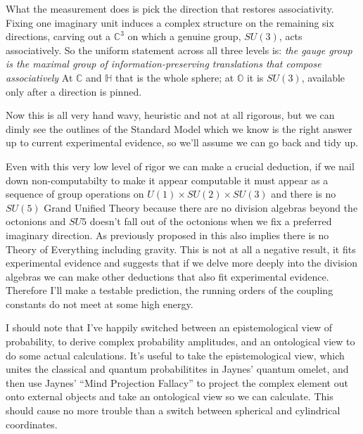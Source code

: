 What the measurement does is pick the direction that restores associativity. Fixing one
imaginary unit induces a complex structure on the remaining six directions, carving out a
$\mathbb{C}^3$ on which a genuine group, $SU(3)$, acts associatively. So the uniform statement
across all three levels is:
\emph{the gauge group is the maximal group of information-preserving translations that compose associatively}
At $\mathbb{C}$ and $\mathbb{H}$ that is the whole sphere; at $\mathbb{O}$ it is $SU(3)$,
available only after a direction is pinned.

Now this is all very hand wavy, heuristic and not at all rigorous, but we can dimly see the
outlines of the Standard Model which we know is the right answer up to current experimental
evidence, so we'll assume we can go back and tidy up.

Even with this very low level of rigor we can make a crucial deduction, if we nail down
non-computabilty to make it appear computable it must appear as a sequence of group operations
on $U(1) \times SU(2) \times SU(3)$ and there is no $SU(5)$ Grand Unified Theory because there
are no division algebras beyond the octonions \autocite{hurwitz1898composition} and $SU{5}$
doesn't fall out of the octonions when we fix a preferred imaginary direction. As previously
proposed in \autocite{small_2006} this also implies there is no Theory of Everything including
gravity. This is not at all a negative result, it fits experimental evidence and suggests that
if we delve more deeply into the division algebras we can make other deductions that also fit
experimental evidence. Therefore I'll make a testable prediction, the running orders of the
coupling constants do not meet at some high energy.

I should note that I've happily switched between an epistemological view of probability, to
derive complex probability amplitudes, and an ontological view to do some actual calculations.
It's useful to take the epistemological view, which unites the classical and quantum
probabilitites in Jaynes' quantum omelet, and then use Jaynes' \enquote{Mind Projection Fallacy}
to project the complex element out onto external objects and take an ontological view so we can
calculate. This should cause no more trouble than a switch between spherical and cylindrical
coordinates.

